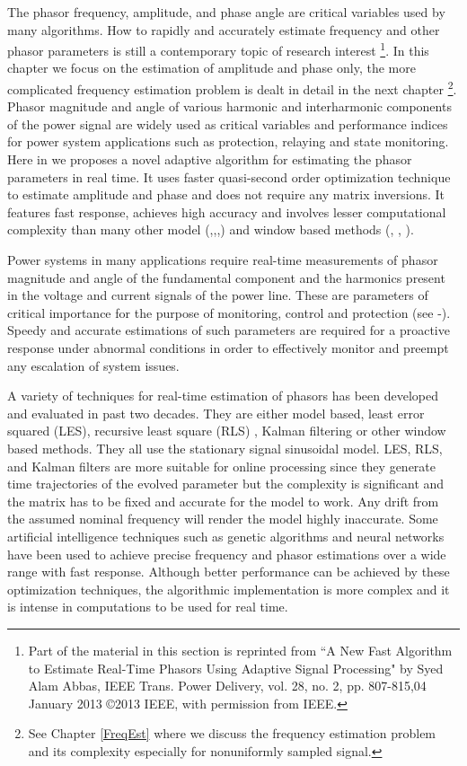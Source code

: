 \documentclass{UCF_ETD}
\begin{document}
The phasor frequency, amplitude, and phase angle are critical variables used by many algorithms. How to rapidly and accurately estimate frequency and other phasor parameters is still a contemporary topic of research interest \footnote{Part of the material in this section is reprinted from ``A New Fast Algorithm to Estimate Real-Time Phasors Using Adaptive Signal Processing" by Syed Alam Abbas, IEEE Trans. Power Delivery, vol. 28, no. 2, pp. 807-815,04 January 2013 \copyright 2013 IEEE, with permission from IEEE.}. In this chapter we focus on the estimation of amplitude and phase only, the more complicated frequency estimation problem is dealt in detail in the next chapter \footnote{See Chapter \ref{FreqEst} where we discuss the frequency estimation problem and its complexity especially for nonuniformly sampled signal.}. Phasor magnitude and angle of various harmonic and interharmonic components of the power signal are widely used as critical variables and performance indices for power system applications such as protection, relaying and state monitoring. Here in we proposes a novel adaptive algorithm for estimating the phasor parameters in real time. It uses faster quasi-second order optimization technique to estimate amplitude and phase and does not require any matrix inversions. It features fast response, achieves high accuracy and involves lesser computational complexity than many other model (\cite{Kamwa1991},\cite{Girgis1990},\cite{Nagger2000},\cite{Lai1999})  and window based methods (\cite{Benmouyal1989}, \cite{Hart1997}, \cite{Sidhu1998}).

Power systems in many applications require real-time measurements of phasor magnitude and angle of the fundamental component and the harmonics present in the voltage and current signals of the power line. These are parameters of critical importance for the purpose of monitoring, control and protection (see \cite{Kamwa1991}-\cite{Sidhu1998}). Speedy and accurate estimations of such parameters are required for a proactive response under abnormal conditions in order to effectively monitor and preempt any escalation of system issues.

A variety of techniques for real-time estimation of phasors has been developed and evaluated in past two decades. They are either model based, least error squared (LES), recursive least square (RLS) \cite{Kamwa1991}, Kalman filtering \cite{Girgis1990} or other window based methods. They all use the stationary signal sinusoidal model. LES, RLS, and Kalman filters are more suitable for online processing since they generate time trajectories of the evolved parameter but the complexity is significant and the matrix has to be fixed and accurate for the model to work. Any drift from the assumed nominal frequency will render the model highly inaccurate. Some artificial intelligence techniques such as genetic algorithms \cite{Nagger2000} and neural networks \cite{Lai1999} have been used to achieve precise frequency and phasor estimations over a wide range with fast response. Although better performance can be achieved by these optimization techniques, the algorithmic implementation is more complex and it is intense in computations to be used for real time.
\end{document}
